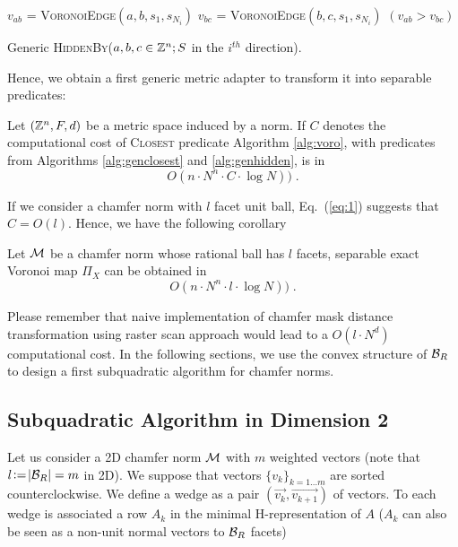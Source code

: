 \documentclass{llncs}
\begin{document}
\begin{algorithm}[H]\small
  $v_{ab}$ = \textsc{VoronoiEdge}$(a,b,s_1, s_{N_i})$\;
  $v_{bc}$ = \textsc{VoronoiEdge}$(b,c,s_1, s_{N_i})$\;
  \Return $(v_{ab}> v_{bc})$\;
  \caption{Generic \textsc{HiddenBy}($a,b,c\in{\mathbb{Z}}^n; S$ in the $i^{th}$
    direction).\label{alg:genhidden}}
\end{algorithm}

Hence, we obtain a first generic metric adapter to transform it into
separable predicates:

\begin{lemma}
\label{lem:generic}
   Let $({\mathbb{Z}}^n, F, d)$ be a metric space induced by a norm. If $C$
   denotes the computational cost of \textsc{Closest} predicate
   Algorithm \ref{alg:voro},  with predicates from Algorithms
   \ref{alg:genclosest} and \ref{alg:genhidden}, is in
  \begin{equation}
    O(n\cdot N^n\cdot C\cdot \log{N}))\;.
  \end{equation}
\end{lemma}

If we consider a chamfer norm with $l$ facet unit ball, Eq.~(\ref{eq:1})
suggests that $C=O(l)$. Hence, we have the following corollary
\begin{corollary}
  Let $\mathcal{M}$ be a chamfer norm whose rational ball has $l$ facets,
  separable exact Voronoi map $\Pi_X$ can be obtained in
 \begin{equation}
    O(n\cdot N^n\cdot l \cdot \log{N}))\;.
  \end{equation}
\end{corollary}

Please remember that naive implementation of chamfer mask distance
transformation using raster scan approach would lead to a $O(l\cdot
N^d)$ computational cost. In the following sections, we use the convex
structure of $\mathcal{B}_R$ to design a first subquadratic algorithm for chamfer
norms.

\subsection{Subquadratic Algorithm in Dimension 2}
\label{sec:subq-algor-dimens}

Let us consider a 2D chamfer norm $\mathcal{M}$ with $m$ weighted vectors (note
that $l\!\mathrel{\mathop:}=\!|\mathcal{B}_R| = m$ in 2D). We suppose that vectors
$\{v_k\}_{k=1\ldots m}$ are sorted counterclockwise. We define a wedge
as a pair $(\vec{v_k},\vec{v_{k+1}})$ of vectors. To each wedge is
associated a row $A_k$ in the minimal H-representation of $A$ ($A_k$
can also be seen as a non-unit normal vectors to $\mathcal{B}_R$
facets\cite{DBLP:journals/pr/NormandE09})
\end{document}
